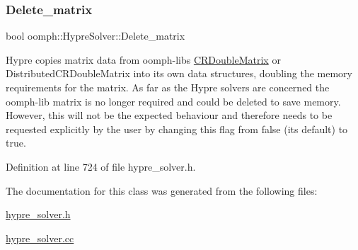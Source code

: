 \subsubsection{\texorpdfstring{Delete\+\_\+matrix}{Delete\_matrix}}
{\footnotesize\ttfamily bool oomph\+::\+Hypre\+Solver\+::\+Delete\+\_\+matrix\hspace{0.3cm}{\ttfamily [private]}}



Hypre copies matrix data from oomph-\/lib\textquotesingle{}s \hyperlink{classoomph_1_1CRDoubleMatrix}{C\+R\+Double\+Matrix} or Distributed\+C\+R\+Double\+Matrix into its own data structures, doubling the memory requirements for the matrix. As far as the Hypre solvers are concerned the oomph-\/lib matrix is no longer required and could be deleted to save memory. However, this will not be the expected behaviour and therefore needs to be requested explicitly by the user by changing this flag from false (its default) to true. 



Definition at line 724 of file hypre\+\_\+solver.\+h.



The documentation for this class was generated from the following files\+:\begin{DoxyCompactItemize}
\item 
\hyperlink{hypre__solver_8h}{hypre\+\_\+solver.\+h}\item 
\hyperlink{hypre__solver_8cc}{hypre\+\_\+solver.\+cc}\end{DoxyCompactItemize}
